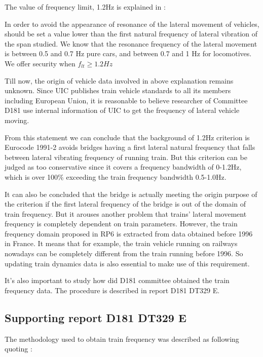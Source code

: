 The value of frequency limit, 1.2Hz is explained in \cite[p3.2: Criterion 2]{d181}:

In order to avoid the appearance of resonance of the lateral movement of vehicles, should be set a value lower than the first natural frequency of lateral vibration of the span studied. We know that the resonance frequency of the lateral movement is between 0.5 and 0.7 Hz pure cars, and between 0.7 and 1 Hz for locomotives. We offer security when $f_{lt} \geq 1.2Hz$

Till now, the origin of vehicle data involved in above explanation remains unknown. Since UIC publishes train vehicle standards to all its members including European Union, it is reasonable to believe researcher of Committee D181 use internal information of UIC to get the frequency of lateral vehicle moving.

From this statement we can conclude that the background of 1.2Hz criterion is Eurocode 1991-2 avoids bridges having a first lateral natural frequency that falls between lateral vibrating frequency of running train. But this criterion can be judged as too conservative since it covers a frequency bandwidth of 0-1.2Hz, which is over 100\% exceeding the train frequency bandwidth 0.5-1.0Hz.

It can also be concluded that the bridge is actually meeting the origin purpose of the criterion if the first lateral frequency of the bridge is out of the domain of train frequency. But it arouses another problem that trains' lateral movement frequency is completely dependent on train parameters. However, the train frequency domain proposed in RP6 is extracted from data obtained before 1996 in France. It means that for example, the train vehicle running on railways nowadays can be completely different from the train running before 1996. So updating train dynamics data is also essential to make use of this requirement.

It's also important to study how did D181 committee obtained the train frequency data. The procedure is described in report D181 DT329 E\cite{d181dt329}. 

\subsection{Supporting report D181 DT329 E}
The methodology used to obtain train frequency was described as following quoting \cite[p.4]{d181dt329}:

